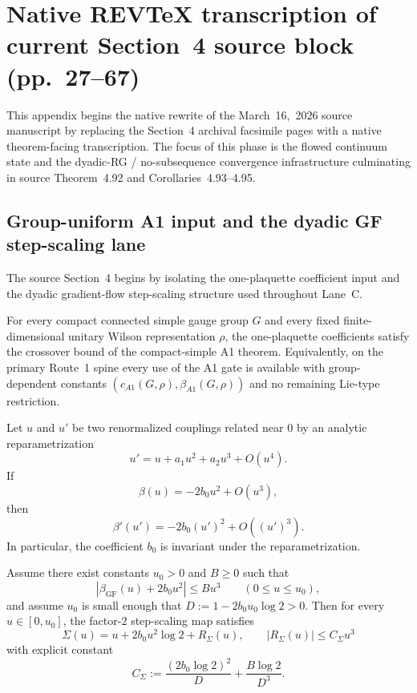 \section{Native REV\TeX{} transcription of current Section~4 source block (pp.~27--67)}
This appendix begins the native rewrite of the March~16,~2026 source manuscript by replacing the Section~4 archival facsimile pages with a native theorem-facing transcription. The focus of this phase is the flowed continuum state and the dyadic-RG / no-subsequence convergence infrastructure culminating in source Theorem~4.92 and Corollaries~4.93--4.95.

\subsection{Group-uniform A1 input and the dyadic GF step-scaling lane}
The source Section~4 begins by isolating the one-plaquette coefficient input and the dyadic gradient-flow step-scaling structure used throughout Lane~C.

\begin{theorem}
For every compact connected simple gauge group $G$ and every fixed finite-dimensional unitary Wilson representation $\rho$, the one-plaquette coefficients satisfy the crossover bound of the compact-simple A1 theorem. Equivalently, on the primary Route~1 spine every use of the A1 gate is available with group-dependent constants $(c_{A1}(G,\rho),\beta_{A1}(G,\rho))$ and no remaining Lie-type restriction.
\end{theorem}

\begin{proposition}
Let $u$ and $u'$ be two renormalized couplings related near $0$ by an analytic reparametrization
\[
u' = u + a_1 u^2 + a_2 u^3 + O(u^4).
\]
If
\[
\beta(u) = -2b_0u^2 + O(u^3),
\]
then
\[
\beta'(u') = -2b_0 (u')^2 + O((u')^3).
\]
In particular, the coefficient $b_0$ is invariant under the reparametrization.
\end{proposition}

\begin{lemma}
Assume there exist constants $u_0>0$ and $B\ge 0$ such that
\[
|\beta_{\mathrm{GF}}(u)+2b_0u^2| \le B u^3
\qquad (0\le u\le u_0),
\]
and assume $u_0$ is small enough that $D:=1-2b_0u_0\log 2>0$. Then for every $u\in[0,u_0]$, the factor-$2$ step-scaling map satisfies
\[
\Sigma(u)=u+2b_0u^2\log 2 + R_\Sigma(u),
\qquad
|R_\Sigma(u)|\le C_\Sigma u^3
\]
with explicit constant
\[
C_\Sigma:= \frac{(2b_0\log 2)^2}{D} + \frac{B\log 2}{D^3}.
\]
\end{lemma}

